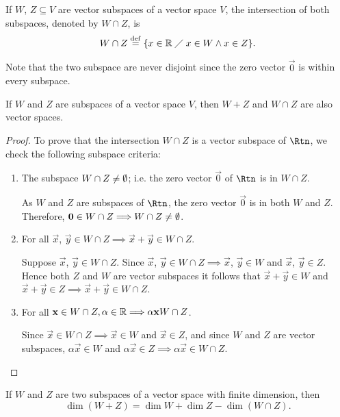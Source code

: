\begin{prop}
    If $W$, $Z\subseteq V$ are vector subspaces of a vector space $V$, the intersection of both subspaces,
    denoted by $W\cap Z$, is
    \begin{equation}
        W\cap Z \overset{\mathrm{def}}{=} \{x\in \mathbb{R}\;\diagup\; x\in W\land x\in Z\}.
    \end{equation}
\end{prop}

\begin{remark}
    Note that the two subspace are never disjoint since the zero vector $\vec{0}$ is within every subspace.
\end{remark}

\begin{lemma}
    If $W$ and $Z$ are subspaces of a vector space $V$, then $W + Z$ and $W\cap Z$ are also vector spaces.
\end{lemma}

\begin{proof}
    To prove that the intersection $W\cap Z$ is a vector subspace of $\Rtn$, we check the following subspace
    criteria:

    \begin{enumerate}
        \item The subspace $W\cap Z\neq \emptyset$; i.e. the zero vector $\vec{0}$ of $\Rtn$ is in $W\cap Z$.

            As $W$ and $Z$ are subspaces of $\Rtn$, the zero vector $\vec{0}$ is in both $W$ and $Z$.
            Therefore, $\mathbf{0}\in W\cap Z\Longrightarrow W\cap Z\neq\emptyset$.

        \item For all $\vec{x}$, $\vec{y}\in W\cap Z\implies \vec{x} + \vec{y}\in W\cap Z$.

            Suppose $\vec{x}$, $\vec{y}\in W\cap Z$. Since $\vec{x}$, $\vec{y}\in W\cap Z\implies \vec{x}$,
            $\vec{y}\in W$ and $\vec{x}$, $\vec{y}\in Z$. Hence both $Z$ and $W$ are vector subspaces it
            follows that $\vec{x} + \vec{y}\in W$ and $\vec{x} + \vec{y}\in Z\implies \vec{x} + \vec{y}\in
            W\cap Z$.

        \item For all $\mathbf{x}\in W\cap Z, \alpha\in\mathbb{R}\Longrightarrow \alpha\mathbf{x} W\cap Z$.

            Since $\vec{x}\in W\cap Z\implies \vec{x}\in W$ and $\vec{x}\in Z$, and since $W$ and $Z$ are
            vector subspaces, $\alpha\vec{x}\in W$ and $\alpha\vec{x}\in Z\implies \alpha\vec{x}\in W\cap Z$.
    \end{enumerate}
\end{proof}

\begin{prop}
    If $W$ and $Z$ are two subspaces of a vector space with finite dimension, then
    \begin{equation}
        \dim\left( W + Z \right) = \dim W + \dim Z - \dim\left( W\cap Z \right). 
    \end{equation}
\end{prop}
